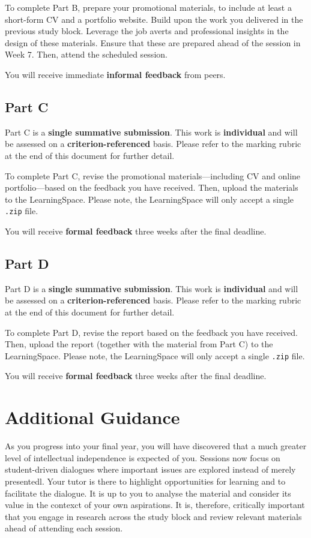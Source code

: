 \documentclass{../../fal_assignment}
\begin{document}
To complete Part B, prepare your promotional materials, to include at least a short-form CV and a portfolio website. Build upon the work you delivered in the previous study block. Leverage the job averts and professional insights in the design of these materials. Ensure that these are prepared ahead of the session in Week 7. Then, attend the scheduled session.

You will receive immediate \textbf{informal feedback} from peers.

\subsection*{Part C}

Part C is a \textbf{single summative submission}. This work is \textbf{individual} and will be assessed on a \textbf{criterion-referenced} basis. Please refer to the marking rubric at the end of this document for further detail.

To complete Part C, revise the promotional materials---including CV and online portfolio---based on the feedback you have received. Then, upload the materials to the LearningSpace. Please note, the LearningSpace will only accept a single \texttt{.zip} file.

You will receive \textbf{formal feedback} three weeks after the final deadline.

\subsection*{Part D}

Part D is a \textbf{single summative submission}. This work is \textbf{individual} and will be assessed on a \textbf{criterion-referenced} basis. Please refer to the marking rubric at the end of this document for further detail.

To complete Part D, revise the report based on the feedback you have received. Then, upload the report (together with the material from Part C) to the LearningSpace. Please note, the LearningSpace will only accept a single \texttt{.zip} file.

You will receive \textbf{formal feedback} three weeks after the final deadline.

\section*{Additional Guidance}

As you progress into your final year, you will have discovered that a much greater level of intellectual independence is expected of you. Sessions now focus on student-driven dialogues where important issues are explored instead of merely presentedl. Your tutor is there to highlight opportunities for learning and to facilitate the dialogue. It is up to you to analyse the material and consider its value in the contexct of your own aspirations. It is, therefore, critically important that you engage in research across the study block and review relevant materials ahead of attending each session.
\end{document}
